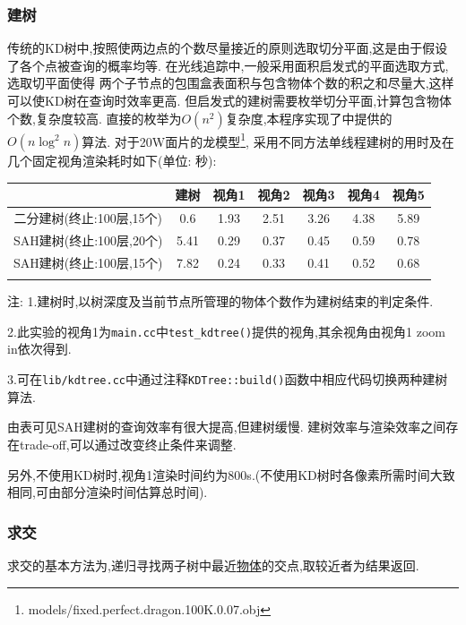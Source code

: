 \subsubsection{建树}
传统的KD树中,按照使两边点的个数尽量接近的原则选取切分平面,这是由于假设了各个点被查询的概率均等.
在光线追踪中,一般采用面积启发式的平面选取方式\cite{kdtree},选取切平面使得
两个子节点的包围盒表面积与包含物体个数的积之和尽量大,这样可以使KD树在查询时效率更高.
但启发式的建树需要枚举切分平面,计算包含物体个数,复杂度较高.
直接的枚举为$ O(n^2)$复杂度,本程序实现了\cite{kdtree}中提供的$ O(n \log^2 n)$算法.
对于20W面片的龙模型\footnote{models/fixed.perfect.dragon.100K.0.07.obj},
采用不同方法单线程建树的用时及在几个固定视角渲染耗时如下(单位: 秒):

\begin{table}[H]
  \begin{threeparttable}

    \begin{tabular}{c|c|c|c|c|c|c}
      \shline
      & 建树 & 视角1 & 视角2 & 视角3 & 视角4 & 视角5 \\ \hline
      二分建树(终止:100层,15个)  & 0.6  & 1.93  & 2.51  & 3.26  & 4.38  & 5.89  \\ \hline
      SAH建树(终止:100层,20个) & 5.41 & 0.29  & 0.37  & 0.45  & 0.59  & 0.78    \\ \hline
      SAH建树(终止:100层,15个) & 7.82 & 0.24  & 0.33  & 0.41  & 0.52  & 0.68    \\ \shline
    \end{tabular}
    \begin{tablenotes}
      \footnotesize
    \item 注: 1.建树时,以树深度及当前节点所管理的物体个数作为建树结束的判定条件.
    \item 2.此实验的视角1为\verb|main.cc|中\verb|test_kdtree()|提供的视角,其余视角由视角1 zoom in依次得到.
    \item 3.可在\verb|lib/kdtree.cc|中通过注释\verb|KDTree::build()|函数中相应代码切换两种建树算法.
    \end{tablenotes}
  \end{threeparttable}
\end{table}

由表可见SAH建树的查询效率有很大提高,但建树缓慢. 建树效率与渲染效率之间存在trade-off,可以通过改变终止条件来调整.

另外,不使用KD树时,视角1渲染时间约为800s.(不使用KD树时各像素所需时间大致相同,可由部分渲染时间估算总时间).

\subsubsection{求交}
求交的基本方法为,递归寻找两子树中最近\underline{物体}的交点,取较近者为结果返回.

